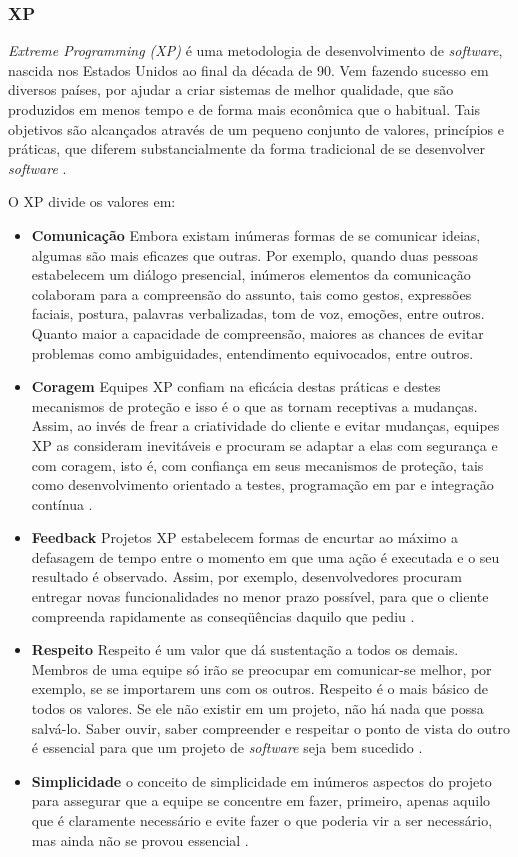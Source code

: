 \documentclass{acm_proc_article-sp}
\begin{document}
\subsubsection{XP}
\textit{Extreme Programming (XP)} é uma metodologia de desenvolvimento de \textit{software}, nascida nos Estados Unidos ao final da década de 90. Vem fazendo sucesso em diversos países, por ajudar a criar sistemas de melhor qualidade, que são produzidos em menos tempo e de forma mais econômica que o habitual. Tais objetivos são alcançados através de um pequeno conjunto de valores, princípios e práticas, que diferem substancialmente da forma tradicional de se desenvolver \textit{software} \cite{xp:agil}.

O XP divide os valores em:

\begin{itemize}
\item \textbf{Comunicação} Embora existam inúmeras formas de se comunicar ideias, algumas são mais eficazes que outras. Por exemplo, quando duas pessoas estabelecem um diálogo presencial, inúmeros elementos da comunicação colaboram para a compreensão do assunto, tais como gestos, expressões faciais, postura, palavras verbalizadas, tom de voz, emoções, entre outros. Quanto maior a capacidade de compreensão, maiores as chances de evitar problemas como ambiguidades, entendimento equivocados, entre outros\cite{xp:agil}.
\item \textbf{Coragem} Equipes XP confiam na eficácia destas práticas e destes mecanismos de proteção e isso é o que as tornam receptivas a mudanças. Assim, ao invés de frear a criatividade do cliente e evitar mudanças, equipes XP as consideram inevitáveis e procuram se adaptar a elas com segurança e com coragem, isto é, com confiança em seus mecanismos de proteção, tais como desenvolvimento orientado a testes, programação em par e integração contínua \cite{xp:agil}.
\item \textbf{Feedback} Projetos XP estabelecem formas de encurtar ao máximo a defasagem de tempo entre o momento em que uma ação é executada e o seu resultado é observado. Assim, por exemplo, desenvolvedores procuram entregar novas funcionalidades no menor prazo possível, para que o cliente compreenda rapidamente as conseqüências daquilo que pediu \cite{xp:agil}.
\item \textbf{Respeito} Respeito é um valor que dá sustentação a todos os demais. Membros de uma equipe só irão se preocupar em comunicar-se melhor, por exemplo, se se importarem uns com os outros. Respeito é o mais básico de todos os valores. Se ele não existir em um projeto, não há nada que possa salvá-lo. Saber ouvir, saber compreender e respeitar o ponto de vista do outro é essencial para que um projeto de \textit{software} seja bem sucedido \cite{xp:agil}.
\item \textbf{Simplicidade} o conceito de simplicidade em inúmeros aspectos do projeto para assegurar que a equipe se concentre em fazer, primeiro, apenas aquilo que é claramente necessário e evite fazer o que poderia vir a ser necessário, mas ainda não se provou essencial \cite{xp:agil}.
\end{itemize}
\end{document}
